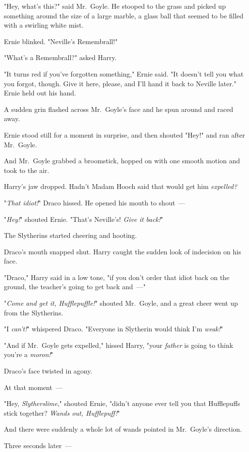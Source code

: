 "Hey, what's this?" said Mr.~Goyle. He stooped to the grass and picked up
something around the size of a large marble, a glass ball that seemed to be
filled with a swirling white mist.

Ernie blinked. "Neville's Remembrall!"

"What's a Remembrall?" asked Harry.

"It turns red if you've forgotten something," Ernie said. "It doesn't tell you
what you forgot, though. Give it here, please, and I'll hand it back to Neville
later." Ernie held out his hand.

A sudden grin flashed across Mr.~Goyle's face and he spun around and raced away.

Ernie stood still for a moment in surprise, and then shouted "Hey!" and ran
after Mr.~Goyle.

And Mr.~Goyle grabbed a broomstick, hopped on with one smooth motion and took
to the air.

Harry's jaw dropped. Hadn't Madam Hooch said that would get him \emph{expelled?}

"\emph{That idiot!}" Draco hissed. He opened his mouth to shout~---

"\emph{Hey!}" shouted Ernie. "That's Neville's! \emph{Give it back!}"

The Slytherins started cheering and hooting.

Draco's mouth snapped shut. Harry caught the sudden look of indecision on his
face.

"Draco," Harry said in a low tone, "if you don't order that idiot back on the
ground, the teacher's going to get back and~---"

"\emph{Come and get it, Hufflepuffle!}" shouted Mr.~Goyle, and a great cheer
went up from the Slytherins.

"I \emph{can't!}" whispered Draco. "Everyone in Slytherin would think I'm
\emph{weak!}"

"And if Mr.~Goyle gets expelled," hissed Harry, "your \emph{father} is going to
think you're a \emph{moron!}"

Draco's face twisted in agony.

At that moment~---

"Hey, \emph{Slytherslime}," shouted Ernie, "didn't anyone ever tell you that
Hufflepuffs stick together? \emph{Wands out, Hufflepuff!}"

And there were suddenly a whole lot of wands pointed in Mr.~Goyle's direction.

Three seconds later~---

